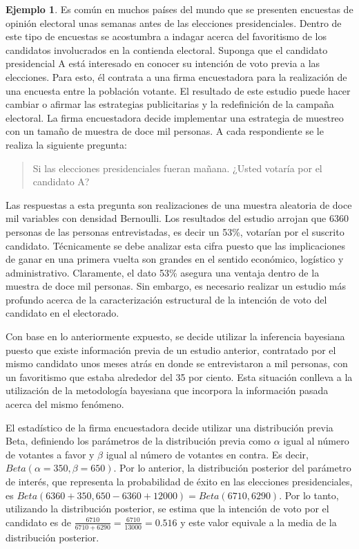 \documentclass[
  10pt,
  spanish,
]{book}
\theoremstyle{definition}
\theoremstyle{definition}
\newtheorem{example}{Ejemplo}[chapter]
\theoremstyle{definition}
\theoremstyle{definition}
\theoremstyle{remark}
\begin{document}
\begin{example}
\protect\hypertarget{exm:bernoelectoral}{}{\label{exm:bernoelectoral} }Es común en muchos países del mundo que se presenten encuestas de opinión electoral unas semanas antes de las elecciones presidenciales. Dentro de este tipo de encuestas se acostumbra a indagar acerca del favoritismo de los candidatos involucrados en la contienda electoral. Suponga que el candidato presidencial A está interesado en conocer su intención de voto previa a las elecciones. Para esto, él contrata a una firma encuestadora para la realización de una encuesta entre la población votante. El resultado de este estudio puede hacer cambiar o afirmar las estrategias publicitarias y la redefinición de la campaña electoral. La firma encuestadora decide implementar una estrategia de muestreo con un tamaño de muestra de doce mil personas. A cada respondiente se le realiza la siguiente pregunta:

\begin{quote}
Si las elecciones presidenciales fueran mañana. ¿Usted votaría por el candidato A?
\end{quote}

Las respuestas a esta pregunta son realizaciones de una muestra aleatoria de doce mil variables con densidad Bernoulli. Los resultados del estudio arrojan que 6360 personas de las personas entrevistadas, es decir un 53\%, votarían por el suscrito candidato. Técnicamente se debe analizar esta cifra puesto que las implicaciones de ganar en una primera vuelta son grandes en el sentido económico, logístico y administrativo. Claramente, el dato 53\% asegura una ventaja dentro de la muestra de doce mil personas. Sin embargo, es necesario realizar un estudio más profundo acerca de la caracterización estructural de la intención de voto del candidato en el electorado.

Con base en lo anteriormente expuesto, se decide utilizar la inferencia bayesiana puesto que existe información previa de un estudio anterior, contratado por el mismo candidato unos meses atrás en donde se entrevistaron a mil personas, con un favoritismo que estaba alrededor del 35 por ciento. Esta situación conlleva a la utilización de la metodología bayesiana que incorpora la información pasada acerca del mismo fenómeno.

El estadístico de la firma encuestadora decide utilizar una distribución previa Beta, definiendo los parámetros de la distribución previa como \(\alpha\) igual al número de votantes a favor y \(\beta\) igual al número de votantes en contra. Es decir, \(Beta(\alpha=350, \beta=650)\). Por lo anterior, la distribución posterior del parámetro de interés, que representa la probabilidad de éxito en las elecciones presidenciales, es \(Beta(6360+350, 650-6360+12000)=Beta(6710, 6290)\). Por lo tanto, utilizando la distribución posterior, se estima que la intención de voto por el candidato es de \(\frac{6710}{6710+6290}=\frac{6710}{13000}=0.516\) y este valor equivale a la media de la distribución posterior.


\end{example}
\end{document}
